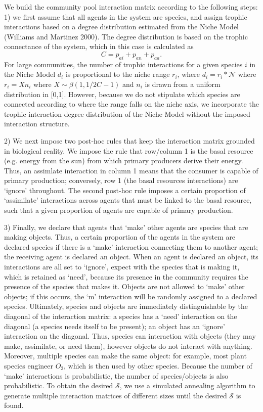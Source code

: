 \documentclass[twocolumn,preprintnumbers,amsmath,amssymb,superscriptaddress]{revtex4-1}
\begin{document}
We build the community pool interaction matrix according to the following steps:
1) we first assume that all agents in the system are species, and assign trophic interactions based on a degree distribution estimated from the Niche Model (Williams and Martinez 2000).
The degree distribution is based on the trophic connectance of the system, which in this case is calculated as 
\begin{equation}
  C = p_{ai}+p_{an}+p_{aa}.
\end{equation}
For large communities, the number of trophic interactions for a given species $i$ in the Niche Model $d_i$ is proportional to the niche range $r_i$, where $d_i = r_i*\mathcal{N}$ where $r_i = Xn_i$ where $X \sim \beta(1,1/2C - 1)$ and $n_i$ is drawn from a uniform distribution in [0,1].
However, because we do not stipulate which species are connected according to where the range falls on the niche axis, we incorporate the trophic interaction degree distribution of the Niche Model without the imposed interaction structure.

2) We next impose two post-hoc rules that keep the interaction matrix grounded in biological reality.
We impose the rule that row/column 1 is the basal resource (e.g. energy from the sun) from which primary producers derive their energy.
Thus, an assimlate interaction in column 1 means that the consumer is capable of primary production; conversely, row 1 (the basal resources interactions) are `ignore' throughout.
The second post-hoc rule imposes a certain proportion of `assimilate' interactions across agents that must be linked to the basal resource, such that a given proportion of agents are capable of primary production.

3) Finally, we declare that agents that `make' other agents are species that are making objects.
Thus, a certain proportion of the agents in the system are declared species if there is a `make' interaction connecting them to another agent; the receiving agent is declared an object.
When an agent is declared an object, its interactions are all set to `ignore', expect with the species that is making it, which is retained as `need', because its presence in the community requires the presence of the species that makes it.
Objects are not allowed to `make' other objects; if this occurs, the `m' interaction will be randomly assigned to a declared species.
Ultimately, species and objects are immediately distinguishable by the diagonal of the interaction matrix: a species has a `need' interaction on the diagonal (a species needs itself to be present); an object has an `ignore' interaction on the diagonal.
Thus, species can interaction with objects (they may make, assimilate, or need them), however objects do not interact with anything.
Moreover, multiple species can make the same object: for example, most plant species engineer $O_2$, which is then used by other species.
Because the number of `make' interactions is probabilistic, the number of species/objects is also probabilistic.
To obtain the desired $\mathcal{S}$, we use a simulated annealing algorithm to generate multiple interaction matrices of different sizes until the desired $\mathcal{S}$ is found.
\end{document}
